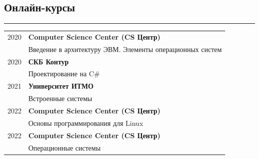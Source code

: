 \documentclass[10pt, final, twoside]{article}
\begin{document}
  \subsection*{\textcolor{darkgray2}{Онлайн-курсы}}
  \vspace*{-5.5mm}
  \par\noindent\rule{\textwidth}{0.1pt}
  \begin{table}[H]
    \begin{tabular}{ll}
      2020 & \textbf{Computer Science Center (CS Центр)}\\
           & Введение в архитектуру ЭВМ. Элементы операционных систем\\\hline
      2020 & \textbf{СКБ Контур}\\
           & Проектирование на C\#\\\hline
      2021 & \textbf{Университет ИТМО}\\
           & Встроенные системы\\\hline
      2022 & \textbf{Computer Science Center (CS Центр)}\\
           & Основы программирования для Linux\\\hline
      2022 & \textbf{Computer Science Center (CS Центр)}\\
           & Операционные системы\\\hline
    \end{tabular}
  \end{table}
\end{document}
